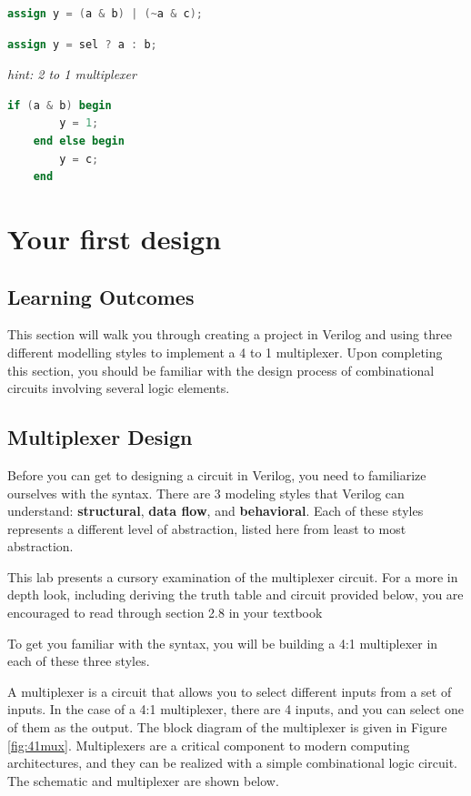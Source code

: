 \documentclass[12pt]{labmanual}
\begin{document}
\begin{lstlisting}[language=Verilog]
    assign y = (a & b) | (~a & c);
\end{lstlisting}
\vspace{3\textheight}
\begin{lstlisting}[language=Verilog]
    assign y = sel ? a : b;
\end{lstlisting}
\textit{\small{hint: 2 to 1 multiplexer}}
\vspace{16em}
\begin{lstlisting}[language=Verilog]  
    if (a & b) begin
        y = 1;
    end else begin
        y = c;
    end
\end{lstlisting}
\newpage
\section{Your first design}
\subsection{Learning Outcomes}
This section will walk you through creating a project in Verilog and using three different modelling styles to implement a 4 to 1 multiplexer. Upon completing this section, you should be familiar with the design process of combinational circuits involving several logic elements.


\subsection{Multiplexer Design}

\begin{paracol}{2}
\switchcolumn[0]    
Before you can get to designing a circuit in Verilog, you need to familiarize ourselves with the syntax. There are 3 modeling styles that Verilog can understand: \textbf{structural}, \textbf{data flow}, and \textbf{behavioral}. Each of these styles represents a different level of abstraction, listed here from least to most abstraction. 
\switchcolumn[1]
\begin{extra}[frametitle={Textbook Reading: Multiplexers}]
    This lab presents a cursory examination of the multiplexer circuit. For a more in depth look, including deriving the truth table and circuit provided below, you are encouraged to read through section 2.8 in your textbook
\end{extra}
\switchcolumn[0]
To get you familiar with the syntax, you will be building a 4:1 multiplexer in each of these three styles.
\end{paracol}
A multiplexer is a circuit that allows you to select different inputs from a set of inputs. In the case of a 4:1 multiplexer, there are 4 inputs, and you can select one of them as the output. 
The block diagram of the multiplexer is given in Figure \ref{fig:41mux}. Multiplexers are a critical component to modern computing architectures, and they can be realized with a simple combinational logic circuit. The schematic and multiplexer are shown below.
\clearpage
\end{document}

